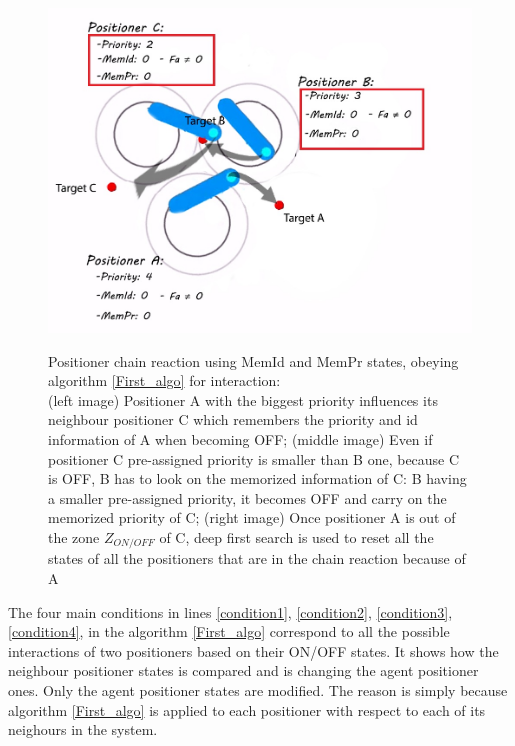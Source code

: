 \documentclass[]{spie}  %
\begin{document}
\begin{figure}[H]
\begin{minipage}[t]{5.4cm}
 			\includegraphics[scale=0.3]{images/ID_PR2.jpg}
 			\label{ID_PR2}
 		\end{minipage}
 		\caption{\centering Positioner chain reaction using MemId and MemPr states, obeying algorithm \ref{First_algo} for interaction:\\
 			(left image) Positioner A with the biggest priority influences its neighbour positioner C which remembers the priority and id information of A when becoming OFF; (middle image) Even if positioner C pre-assigned priority is smaller than B one, because C is OFF, B has to look on the memorized information of C: B having a smaller pre-assigned priority, it becomes OFF and carry on the memorized priority of C; (right image) Once positioner A is out of the zone $Z_{ON/OFF}$ of C, deep first search is used to reset all the states of all the positioners that are in the chain reaction because of A }
 		\label{ID_PR}
 	\end{figure}
	   The four main conditions in lines \ref{condition1}, \ref{condition2}, \ref{condition3}, \ref{condition4}, in the algorithm \ref{First_algo} correspond to all the possible interactions of two positioners based on their ON/OFF states. It shows how the neighbour positioner states is compared and is changing the agent positioner ones. Only the agent positioner states are modified. The reason is simply because algorithm \ref{First_algo} is applied to each positioner with respect to each of its neighours in the system.\\
	 
\end{document}
